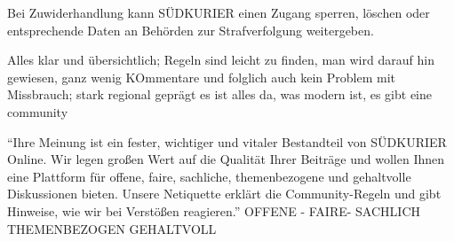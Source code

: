 Bei Zuwiderhandlung kann SÜDKURIER einen Zugang sperren, löschen oder entsprechende Daten an Behörden zur Strafverfolgung weitergeben. 


Alles klar und übersichtlich; Regeln sind leicht zu finden, man wird darauf hin gewiesen, ganz wenig KOmmentare und folglich auch kein Problem mit Missbrauch; stark regional geprägt 
es ist alles da, was modern ist, es gibt eine community

``Ihre Meinung ist ein fester, wichtiger und vitaler Bestandteil von SÜDKURIER Online. Wir legen großen Wert auf die Qualität Ihrer Beiträge und wollen Ihnen eine Plattform für offene, faire, sachliche, themenbezogene und gehaltvolle Diskussionen bieten. Unsere Netiquette erklärt die Community-Regeln und gibt Hinweise, wie wir bei Verstößen reagieren.'' OFFENE - FAIRE- SACHLICH THEMENBEZOGEN GEHALTVOLL



